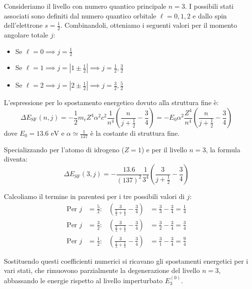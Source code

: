 \begin{exercise}
\begin{solution}
Consideriamo il livello con numero quantico principale \( n=3 \). I possibili stati associati sono definiti dal numero quantico orbitale \( \ell = 0, 1, 2 \) e dallo spin dell'elettrone \( s = \frac{1}{2} \). Combinandoli, otteniamo i seguenti valori per il momento angolare totale \( j \):
\begin{itemize}
    \item Se \( \ell = 0 \implies j = \frac{1}{2} \)
    \item Se \( \ell = 1 \implies j = \left| 1 \pm \frac{1}{2} \right| \implies j = \frac{1}{2}, \frac{3}{2} \)
    \item Se \( \ell = 2 \implies j = \left| 2 \pm \frac{1}{2} \right| \implies j = \frac{3}{2}, \frac{5}{2} \)
\end{itemize}

L'espressione per lo spostamento energetico dovuto alla struttura fine è:
\begin{equation}
    \Delta E_{\text{SF}}(n,j) = - \frac{1}{2} m_e Z^4 \alpha^2 c^2 \frac{1}{n^4} \left( \frac{n}{j+\frac{1}{2}} - \frac{3}{4} \right) = - E_0 \alpha^2 \frac{Z^4}{n^4} \left( \frac{n}{j+\frac{1}{2}} - \frac{3}{4} \right)
\end{equation}
dove \( E_0 = 13.6 \text{ eV} \) e \( \alpha \simeq \frac{1}{137} \) è la costante di struttura fine.

Specializzando per l'atomo di idrogeno (\( Z=1 \)) e per il livello \( n=3 \), la formula diventa:
\begin{equation}
    \Delta E_{\text{SF}}\left(3,j\right) = - \frac{13.6}{(137)^2} \frac{1}{3^4} \left( \frac{3}{j+\frac{1}{2}} - \frac{3}{4} \right)
\end{equation}

Calcoliamo il termine in parentesi per i tre possibili valori di \( j \):
\begin{align}
    \text{Per } j &= \frac{5}{2}: & \left( \frac{3}{\frac{5}{2} + \frac{1}{2}} - \frac{3}{4} \right) &= \frac{3}{3} - \frac{3}{4} = \frac{1}{4} \\
    \text{Per } j &= \frac{3}{2}: & \left( \frac{3}{\frac{3}{2} + \frac{1}{2}} - \frac{3}{4} \right) &= \frac{3}{2} - \frac{3}{4} = \frac{3}{4} \\
    \text{Per } j &= \frac{1}{2}: & \left( \frac{3}{\frac{1}{2} + \frac{1}{2}} - \frac{3}{4} \right) &= \frac{3}{1} - \frac{3}{4} = \frac{9}{4}
\end{align}

Sostituendo questi coefficienti numerici si ricavano gli spostamenti energetici per i vari stati, che rimuovono parzialmente la degenerazione del livello \( n=3 \), abbassando le energie rispetto al livello imperturbato \( E_3^{(0)} \).


\end{solution}
\end{exercise}
